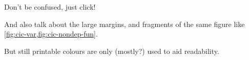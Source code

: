 Don't be confused, just click!

And also talk about the large margins, and fragments of the same figure like
\cref{fig:cic-var,fig:cic-nondep-fun}.

But still printable \textemdash{} colours are only (mostly?) used to aid readability.

\endgroup


\cleardoubleevenemptypage{}


\begingroup %

\hypersetup{allcolors=.}

\setlength{\textheight}{230\vscale} %

\etocstandarddisplaystyle%
\etocstandardlines%
\setcounter{tocdepth}{\sectiontocdepth} %

\tableofcontents %

\setcounter{tocdepth}{\subsectiontocdepth} %




\endgroup
{}
